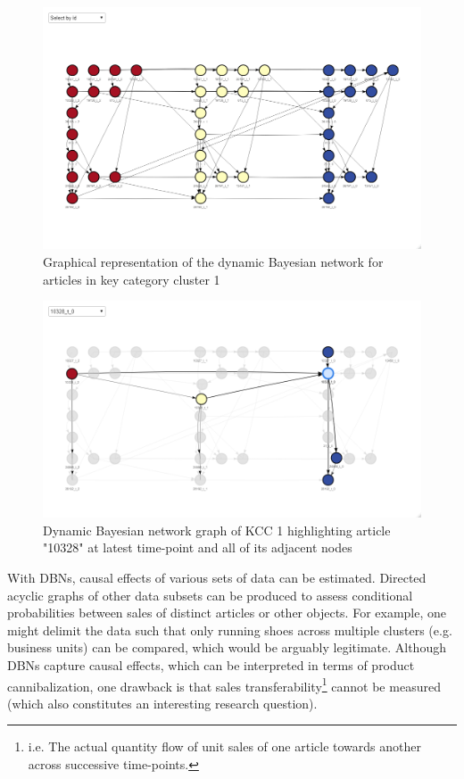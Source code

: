 


\begin{figure}[H]
\centering
  \includegraphics[width=0.95\linewidth]{figures/dbn_kcc_1_all.png}
  \caption{Graphical representation of the dynamic Bayesian network for articles in key category cluster 1}
  \label{fig:dbn_kcc_1_all}
\end{figure}




\begin{figure}[H]
\centering
  \includegraphics[width=0.95\linewidth]{figures/dbn_kcc_1_article_10328_t_0.png}
  \caption{Dynamic Bayesian network graph of KCC 1 highlighting article "10328" at latest time-point and all of its adjacent nodes}
  \label{fig:dbn_kcc_1_article_10328_t_0}
\end{figure}


With \acp{DBN}, causal effects of various sets of data can be estimated. Directed acyclic graphs of other data subsets can be produced to assess conditional probabilities between sales of distinct articles or other objects. For example, one might delimit the data such that only running shoes across multiple clusters (e.g. business units) can be compared, which would be arguably legitimate. Although \acp{DBN} capture causal effects, which can be interpreted in terms of product cannibalization, one drawback is that sales transferability\footnote{i.e. The actual quantity flow of unit sales of one article towards another across successive time-points.} cannot be measured (which also constitutes an interesting research question).

